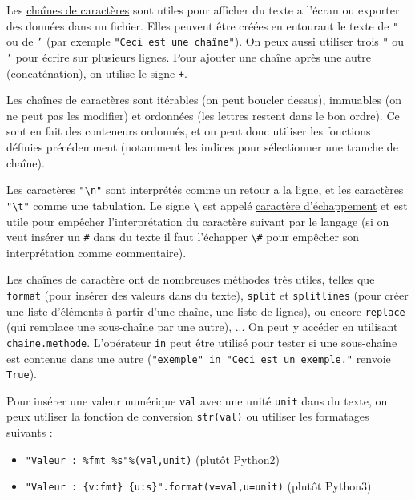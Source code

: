 \documentclass{article}
\begin{document}
Les \href{https://fr.wikibooks.org/wiki/Programmation_Python/Chaines_de_caract\%C3\%A8res}{chaînes de caractères} sont utiles pour afficher du texte a l'écran ou exporter des données dans un fichier. Elles peuvent être créées en entourant le texte de \texttt{"} ou de \texttt{'} (par exemple \texttt{"Ceci est une chaîne"}). On peux aussi utiliser trois \texttt{"} ou \texttt{'} pour écrire sur plusieurs lignes. Pour ajouter une chaîne après une autre (concaténation), on utilise le signe \texttt{+}.

Les chaînes de caractères sont itérables (on peut boucler dessus), immuables (on ne peut pas les modifier) et ordonnées (les lettres restent dans le bon ordre). Ce sont en fait des conteneurs ordonnés, et on peut donc utiliser les fonctions définies précédemment (notamment les indices pour sélectionner une tranche de chaîne).

Les caractères \texttt{"\textbackslash n"} sont interprétés comme un retour a la ligne, et les caractères \texttt{"\textbackslash t"} comme une tabulation. Le signe \texttt{\textbackslash} est appelé \href{https://fr.wikipedia.org/wiki/Caract\%C3\%A8re_d\%27\%C3\%A9chappement}{caractère d'échappement} et est utile pour empêcher l'interprétation du caractère suivant par le langage (si on veut insérer un \texttt{\#} dans du texte il faut l'échapper \texttt{\textbackslash \#} pour empêcher son interprétation comme commentaire).

Les chaînes de caractère ont de nombreuses méthodes très utiles, telles que \texttt{format} (pour insérer des valeurs dans du texte), \texttt{split} et \texttt{splitlines} (pour créer une liste d'éléments à partir d'une chaîne, une liste de lignes), ou encore \texttt{replace} (qui remplace une sous-chaîne par une autre), ... On peut y accéder en utilisant \texttt{chaine.methode}. L'opérateur \texttt{in} peut être utilisé pour tester si une sous-chaîne est contenue dans une autre (\texttt{"exemple" in "Ceci est un exemple."} renvoie \texttt{True}).

Pour insérer une valeur numérique \texttt{val} avec une unité \texttt{unit} dans du texte, on peux utiliser la fonction de conversion \texttt{str(val)} ou utiliser les formatages suivants :
\begin{itemize}
    \item \texttt{"Valeur : \%fmt \%s"\%(val,unit)} (plutôt Python2) 
    \item \texttt{"Valeur : \{v:fmt\} \{u:s\}".format(v=val,u=unit)} (plutôt Python3)
\end{itemize}
\end{document}
